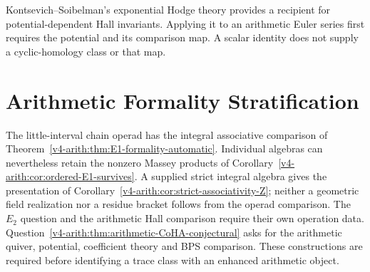 Kontsevich--Soibelman's exponential Hodge theory provides a recipient
for potential-dependent Hall invariants. Applying it to an arithmetic
Euler series first requires the potential and its comparison map.
A scalar identity does not supply a cyclic-homology class or that map.

\section{Arithmetic Formality Stratification}
\label{v4-arith:ks:stratification}

The little-interval chain operad has the integral associative
comparison of Theorem~\ref{v4-arith:thm:E1-formality-automatic}. Individual
algebras can nevertheless retain the nonzero Massey products of
Corollary~\ref{v4-arith:cor:ordered-E1-survives}. A supplied strict
integral algebra gives the presentation of
Corollary~\ref{v4-arith:cor:strict-associativity-Z}; neither a geometric
field realization nor a residue bracket follows from the operad
comparison. The \(E_2\) question and the arithmetic Hall
comparison require their own operation data. Question~\ref{v4-arith:thm:arithmetic-CoHA-conjectural} asks for the
arithmetic quiver, potential, coefficient theory and BPS comparison.
These constructions are required before identifying a trace class
with an enhanced arithmetic object.
